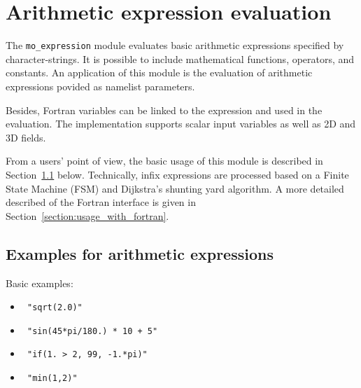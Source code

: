 %

\section{Arithmetic expression evaluation}

The \texttt{mo\_expression} module evaluates basic arithmetic
expressions specified by character-strings.
%
It is possible to include mathematical functions, operators, and
constants.
An application of this module is the evaluation of arithmetic
expressions povided as namelist parameters.

Besides, Fortran variables can be linked to the expression and used in
the evaluation.
The implementation supports scalar input variables as well as 2D and
3D fields.

From a users' point of view, the basic usage of this module is
described in Section~\ref{section:examples_for_arithmetic_expressions}
below.
Technically, infix expressions are processed based on a Finite State
Machine (FSM) and Dijkstra's shunting yard algorithm.
A more detailed described of the Fortran interface is given in
Section~\ref{section:usage_with_fortran}.


\subsection{Examples for arithmetic expressions}
\label{section:examples_for_arithmetic_expressions}

Basic examples:
\begin{itemize}
  \item \texttt{ "sqrt(2.0)" }
  \item \texttt{ "sin(45*pi/180.) * 10 + 5" }
  \item \texttt{ "if(1. > 2, 99, -1.*pi)" }
  \item \texttt{ "min(1,2)" }
\end{itemize}

